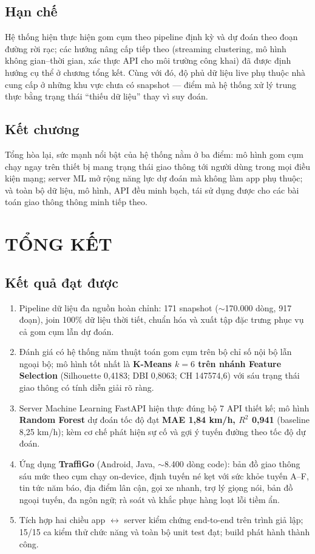 \section{Hạn chế}
Hệ thống hiện thực hiện gom cụm theo pipeline định kỳ và dự đoán theo đoạn đường rời rạc; các hướng nâng cấp tiếp theo (streaming clustering, mô hình không gian--thời gian, xác thực API cho môi trường công khai) đã được định hướng cụ thể ở chương tổng kết. Cùng với đó, độ phủ dữ liệu live phụ thuộc nhà cung cấp ở những khu vực chưa có snapshot --- điểm mà hệ thống xử lý trung thực bằng trạng thái ``thiếu dữ liệu'' thay vì suy đoán.

\section{Kết chương}
Tổng hòa lại, sức mạnh nổi bật của hệ thống nằm ở ba điểm: mô hình gom cụm chạy ngay trên thiết bị mang trạng thái giao thông tới người dùng trong mọi điều kiện mạng; server ML mở rộng năng lực dự đoán mà không làm app phụ thuộc; và toàn bộ dữ liệu, mô hình, API đều minh bạch, tái sử dụng được cho các bài toán giao thông thông minh tiếp theo.

\chapter{TỔNG KẾT}

\section{Kết quả đạt được}
\begin{enumerate}[label=\textbf{(\arabic*)},leftmargin=2cm,itemsep=2pt]
 \item Pipeline dữ liệu đa nguồn hoàn chỉnh: 171 snapshot ($\sim$170.000 dòng, 917 đoạn), join 100\% dữ liệu thời tiết, chuẩn hóa và xuất tập đặc trưng phục vụ cả gom cụm lẫn dự đoán.
 \item Đánh giá có hệ thống năm thuật toán gom cụm trên bộ chỉ số nội bộ lẫn ngoại bộ; mô hình tốt nhất là \textbf{K-Means $k=6$ trên nhánh Feature Selection} (Silhouette 0{,}4183; DBI 0{,}8063; CH 147574{,}6) với sáu trạng thái giao thông có tính diễn giải rõ ràng.
 \item Server Machine Learning FastAPI hiện thực đúng bộ 7 API thiết kế; mô hình \textbf{Random Forest} dự đoán tốc độ đạt \textbf{MAE 1{,}84 km/h, $R^2$ 0{,}941} (baseline 8{,}25 km/h); kèm cơ chế phát hiện sự cố và gợi ý tuyến đường theo tốc độ dự đoán.
 \item Ứng dụng \textbf{TraffiGo} (Android, Java, $\sim$8.400 dòng code): bản đồ giao thông sáu mức theo cụm chạy on-device, định tuyến né kẹt với sức khỏe tuyến A--F, tin tức năm báo, địa điểm lân cận, gọi xe nhanh, trợ lý giọng nói, bản đồ ngoại tuyến, đa ngôn ngữ; rà soát và khắc phục hàng loạt lỗi tiềm ẩn.
 \item Tích hợp hai chiều app $\leftrightarrow$ server kiểm chứng end-to-end trên trình giả lập; 15/15 ca kiểm thử chức năng và toàn bộ unit test đạt; build phát hành thành công.
\end{enumerate}

